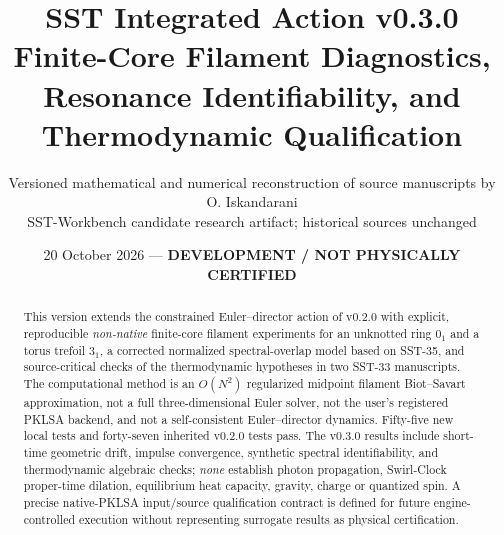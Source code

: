 \documentclass[11pt,a4paper]{article}
\title{\textbf{SST Integrated Action v0.3.0}\\[0.5ex]\large Finite-Core Filament Diagnostics, Resonance Identifiability, and Thermodynamic Qualification}
\author{Versioned mathematical and numerical reconstruction of source manuscripts by O. Iskandarani\\\small SST-Workbench candidate research artifact; historical sources unchanged}
\date{20 October 2026 --- \textbf{DEVELOPMENT / NOT PHYSICALLY CERTIFIED}}
\begin{document}
\maketitle
\begin{abstract}
This version extends the constrained Euler--director action of v0.2.0 with explicit, reproducible \emph{non-native} finite-core filament experiments for an unknotted ring $0_1$ and a torus trefoil $3_1$, a corrected normalized spectral-overlap model based on SST-35, and source-critical checks of the thermodynamic hypotheses in two SST-33 manuscripts. The computational method is an $O(N^2)$ regularized midpoint filament Biot--Savart approximation, not a full three-dimensional Euler solver, not the user's registered PKLSA backend, and not a self-consistent Euler--director dynamics. Fifty-five new local tests and forty-seven inherited v0.2.0 tests pass. The v0.3.0 results include short-time geometric drift, impulse convergence, synthetic spectral identifiability, and thermodynamic algebraic checks; \emph{none} establish photon propagation, Swirl-Clock proper-time dilation, equilibrium heat capacity, gravity, charge or quantized spin. A precise native-PKLSA input/source qualification contract is defined for future engine-controlled execution without representing surrogate results as physical certification.
\end{abstract}
\tableofcontents\clearpage
\end{document}
